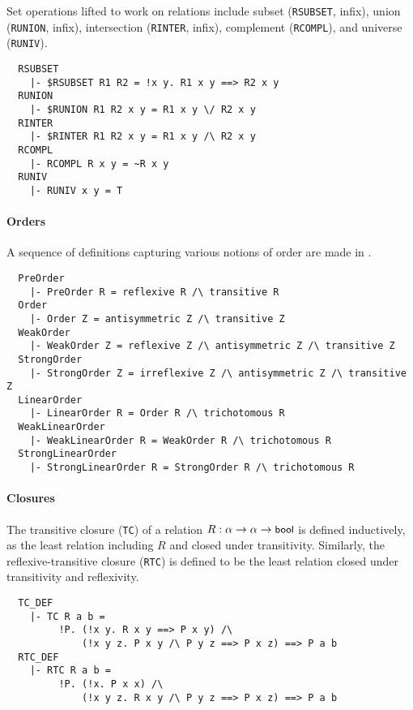 Set  operations lifted to work on relations include subset
({\small\verb+RSUBSET+}, infix),
union ({\small\verb+RUNION+}, infix),
intersection ({\small\verb+RINTER+}, infix),
complement ({\small\verb+RCOMPL+}), and universe ({\small\verb+RUNIV+}).
%
\begin{hol}
{\small
\begin{verbatim}
  RSUBSET
    |- $RSUBSET R1 R2 = !x y. R1 x y ==> R2 x y
  RUNION
    |- $RUNION R1 R2 x y = R1 x y \/ R2 x y
  RINTER
    |- $RINTER R1 R2 x y = R1 x y /\ R2 x y
  RCOMPL
    |- RCOMPL R x y = ~R x y
  RUNIV
    |- RUNIV x y = T
\end{verbatim}
}
\end{hol}

\paragraph {Orders}

A sequence of definitions capturing various notions of order are made
in .
%
\begin{hol}
{\small
\begin{verbatim}
  PreOrder
    |- PreOrder R = reflexive R /\ transitive R
  Order
    |- Order Z = antisymmetric Z /\ transitive Z
  WeakOrder
    |- WeakOrder Z = reflexive Z /\ antisymmetric Z /\ transitive Z
  StrongOrder
    |- StrongOrder Z = irreflexive Z /\ antisymmetric Z /\ transitive Z
  LinearOrder
    |- LinearOrder R = Order R /\ trichotomous R
  WeakLinearOrder
    |- WeakLinearOrder R = WeakOrder R /\ trichotomous R
  StrongLinearOrder
    |- StrongLinearOrder R = StrongOrder R /\ trichotomous R
\end{verbatim}
}
\end{hol}

\paragraph {Closures}

The transitive closure ({\small\verb+TC+}) of a relation $R : \alpha
\to\alpha\to\mbox{\small{\textbf{\sf{bool}}}}$ is defined inductively, as the least
relation including $R$ and closed under transitivity. Similarly, the
reflexive-transitive closure ({\small\verb+RTC+}) is defined to be the least
relation closed under transitivity and reflexivity.
%
\begin{hol}
{\small
\begin{verbatim}
  TC_DEF
    |- TC R a b =
         !P. (!x y. R x y ==> P x y) /\
             (!x y z. P x y /\ P y z ==> P x z) ==> P a b
  RTC_DEF
    |- RTC R a b =
         !P. (!x. P x x) /\
             (!x y z. R x y /\ P y z ==> P x z) ==> P a b
\end{verbatim}
}
\end{hol}

